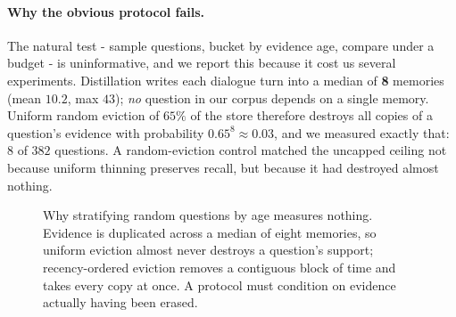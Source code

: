 \documentclass{article}
\theoremstyle{definition}\newtheorem{remark}{Remark}
\theoremstyle{plain}\newtheorem{proposition}{Proposition}
\begin{document}
\paragraph{Why the obvious protocol fails.} The natural test - sample
questions, bucket by evidence age, compare under a budget - is uninformative,
and we report this because it cost us several experiments. Distillation writes
each dialogue turn into a median of \textbf{8} memories (mean $10.2$, max $43$);
\emph{no} question in our corpus depends on a single memory. Uniform random
eviction of $65\%$ of the store therefore destroys all copies of a question's
evidence with probability $0.65^{8}\approx0.03$, and we measured exactly that:
$8$ of $382$ questions. A random-eviction control matched the uncapped ceiling
not because uniform thinning preserves recall, but because it had destroyed
almost nothing.


\begin{figure}[t]
\centering
{}
\caption{Why stratifying random questions by age measures nothing. Evidence is
duplicated across a median of eight memories, so uniform eviction almost never
destroys a question's support; recency-ordered eviction removes a contiguous
block of time and takes every copy at once. A protocol must condition on
evidence actually having been erased.}
\label{fig:redundancy}
\end{figure}
\end{document}
